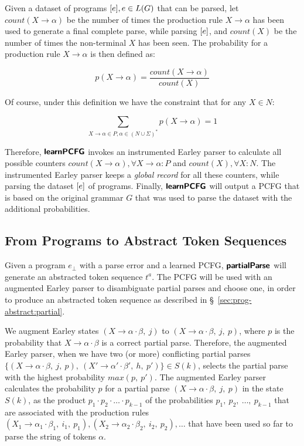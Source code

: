 Given a dataset of programs $[e], e \in L(G)$ that can be parsed, let
$count(X \rightarrow \alpha)$ be the number of times the production rule $X
\rightarrow \alpha$ has been used to generate a final complete parse, while
parsing $[e]$, and $count(X)$ be the number of times the non-terminal $X$
has been seen. The probability for a production rule $X \rightarrow \alpha$ is
then defined as:

\begin{equation*}
    p(X \rightarrow \alpha) = \frac{count(X \rightarrow \alpha)}{count(X)}
\end{equation*}

Of course, under this definition we have the constraint that for any $X \in N$:

\begin{equation*}
    \sum_{X \rightarrow \alpha \in P, \alpha \in (N \cup \Sigma)^{\ast}}{p(X \rightarrow \alpha)} = 1
\end{equation*}

Therefore, $\bm{\mathsf{learnPCFG}}$ invokes an instrumented Earley parser to calculate
all possible counters $count(X \rightarrow \alpha), \forall X \rightarrow
\alpha: P$ and $count(X), \forall X: N$. The instrumented Earley parser keeps a
\emph{global record} for all these counters, while parsing the dataset
$[e]$ of programs. Finally, $\bm{\mathsf{learnPCFG}}$ will output a PCFG that is
based on the original grammar $G$ that was used to parse the dataset with the
additional probabilities.

\subsection{From Programs to Abstract Token Sequences}

Given a program $e_{\bot}$ with a parse error and a learned PCFG, $\bm{\mathsf{partialParse}}$
will generate an abstracted token sequence $t^a$. The PCFG will be used with an
augmented Earley parser to disambiguate partial parses and choose one, in order
to produce an abstracted token sequence as described in
\S~\ref{sec:prog-abstract:partial}.

%
We augment Earley states $(X \rightarrow \alpha \cdot \beta,\ j)$ to $(X
\rightarrow \alpha \cdot \beta,\ j,\ p)$, where $p$ is the probability that $X
\rightarrow \alpha \cdot \beta$ is a correct partial parse. Therefore, the
augmented Earley parser, when we have two (or more) conflicting partial parses
$\{(X \rightarrow \alpha \cdot \beta,\ j,\ p),\ (X' \rightarrow \alpha' \cdot
\beta',\ h,\ p')\} \in S(k)$, selects the partial parse with the highest
probability $max(p,\ p')$. The augmented Earley parser calculates the
probability $p$ for a partial parse $(X \rightarrow \alpha \cdot \beta,\ j,\ p)$
in the state $S(k)$, as the product $p_1 \cdot p_2 \cdot \dots \cdot p_{k-1}$ of
the probabilities $p_1,\ p_2,\ \dots,\ p_{k-1}$ that are associated with the
production rules $(X_1 \rightarrow \alpha_1 \cdot \beta_1,\ i_1,\ p_1), (X_2
\rightarrow \alpha_2 \cdot \beta_2,\ i_2,\ p_2), \dots$ that have been used so
far to parse the string of tokens $\alpha$.




